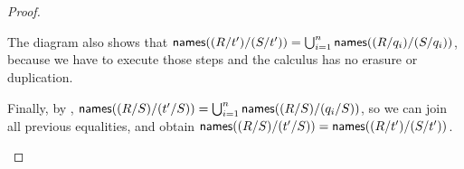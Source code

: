 \begin{proof}
\begin{enumerate}
\begin{enumerate}
\begin{enumerate}
            The diagram also shows that
            $\mathsf{names}((R / t') / (S / t')) = \bigcup_{i=1}^n \mathsf{names}((R / q_i) / (S / q_i))$, because we have to execute those steps and the calculus has no erasure or duplication.

            Finally, by ,
            $\mathsf{names}((R / S) / (t' / S)) = \bigcup_{i=1}^n \mathsf{names}((R / S) / (q_i / S))$,
            so we can join all previous equalities, and obtain
            $\mathsf{names}((R / S) / (t' / S)) = \mathsf{names}((R / t') / (S / t'))$.
        \end{enumerate}
    \end{enumerate}
\end{enumerate}
\end{proof}



